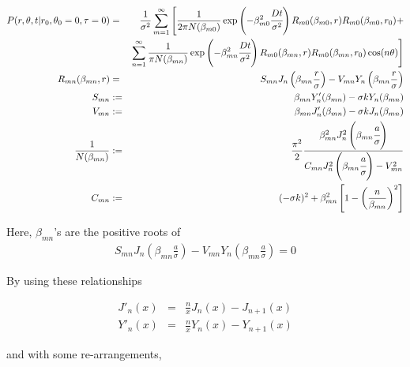 \documentclass{article}
\begin{document}
\begin{eqnarray}
    P(r, \theta, t | r_0, \theta_0 = 0, \tau = 0) &=& \frac{1}{\sigma^2}
    \sum_{m=1}^{\infty}\Bigg[
        \frac{1}{2\pi N(\beta_{m0})}
        \exp\left(-\beta_{m0}^2\cfrac{D t}{\sigma^2}\right)
        R_{m0}(\beta_{m0}, r) R_{m0}(\beta_{m0}, r_0) +
        \nonumber\\
        & &\sum_{n=1}^{\infty} \frac{1}{\pi N(\beta_{mn})}
        \exp\left(-\beta_{mn}^2\cfrac{D t}{\sigma^2}\right)
        R_{m0}(\beta_{mn}, r) R_{m0}(\beta_{mn}, r_0)\cos(n\theta) \Bigg] \\
    R_{mn}(\beta_{mn}, r) &=& S_{mn}J_n\left(\beta_{mn} \frac{r}{\sigma}\right) -
                              V_{mn}Y_n\left(\beta_{mn} \frac{r}{\sigma}\right) \\
    S_{mn} &:=& \beta_{mn}Y'_n(\beta_{mn}) - \sigma kY_n(\beta_{mn}) \\
    V_{mn} &:=& \beta_{mn}J'_n(\beta_{mn}) - \sigma kJ_n(\beta_{mn}) \\
    \frac{1}{N(\beta_{mn})} &:=& \frac{\pi^2}{2}
        \frac{\beta_{mn}^2 J^2_n\left(\beta_{mn}\cfrac{a}{\sigma}\right)}
             {C_{mn} J_n^2\left(\beta_{mn}\cfrac{a}{\sigma}\right) - V_{mn}^2} \\
    C_{mn} &:=& (-\sigma k)^2 + \beta_{mn}^2 \left[1 - \left(\frac{n}{\beta_{mn}}\right)^2\right]
\end{eqnarray}

Here, $\beta_{mn}$'s are the positive roots of
\begin{eqnarray}
    S_{mn} J_n\left(\beta_{mn}\frac{a}{\sigma}\right) -
    V_{mn} Y_n\left(\beta_{mn}\frac{a}{\sigma}\right) = 0
\end{eqnarray}

By using these relationships

\begin{eqnarray}
    J'_n(x) &=&  \frac{n}{x}J_n(x) - J_{n+1}(x) \\
    Y'_n(x) &=&  \frac{n}{x}Y_n(x) - Y_{n+1}(x)
\end{eqnarray}

and with some re-arrangements,
\end{document}
